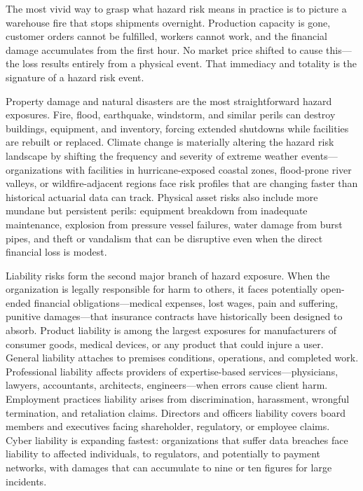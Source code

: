 \documentclass[11pt,openany]{book}
\begin{document}
The most vivid way to grasp what hazard risk means in practice is to picture a warehouse fire that stops shipments overnight. Production capacity is gone, customer orders cannot be fulfilled, workers cannot work, and the financial damage accumulates from the first hour. No market price shifted to cause this---the loss results entirely from a physical event. That immediacy and totality is the signature of a hazard risk event.

Property damage and natural disasters are the most straightforward hazard exposures. Fire, flood, earthquake, windstorm, and similar perils can destroy buildings, equipment, and inventory, forcing extended shutdowns while facilities are rebuilt or replaced. Climate change is materially altering the hazard risk landscape by shifting the frequency and severity of extreme weather events---organizations with facilities in hurricane-exposed coastal zones, flood-prone river valleys, or wildfire-adjacent regions face risk profiles that are changing faster than historical actuarial data can track. Physical asset risks also include more mundane but persistent perils: equipment breakdown from inadequate maintenance, explosion from pressure vessel failures, water damage from burst pipes, and theft or vandalism that can be disruptive even when the direct financial loss is modest.

Liability risks form the second major branch of hazard exposure. When the organization is legally responsible for harm to others, it faces potentially open-ended financial obligations---medical expenses, lost wages, pain and suffering, punitive damages---that insurance contracts have historically been designed to absorb. Product liability is among the largest exposures for manufacturers of consumer goods, medical devices, or any product that could injure a user. General liability attaches to premises conditions, operations, and completed work. Professional liability affects providers of expertise-based services---physicians, lawyers, accountants, architects, engineers---when errors cause client harm. Employment practices liability arises from discrimination, harassment, wrongful termination, and retaliation claims. Directors and officers liability covers board members and executives facing shareholder, regulatory, or employee claims. Cyber liability is expanding fastest: organizations that suffer data breaches face liability to affected individuals, to regulators, and potentially to payment networks, with damages that can accumulate to nine or ten figures for large incidents.
\end{document}
